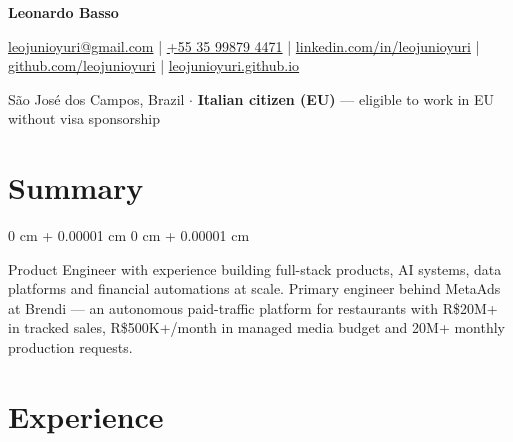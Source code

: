 \documentclass[10pt, a4paper]{article}
\newenvironment{onecolentry}{
    \begin{adjustwidth}{
        0 cm + 0.00001 cm
    }{
        0 cm + 0.00001 cm
    }
}{
    \end{adjustwidth}
}
\begin{document}
    \begin{center}
        {\fontsize{25pt}{25pt}\selectfont \textbf{Leonardo Basso}}

        \vspace{5pt}

        \normalsize
        \href{mailto:leojunioyuri@gmail.com}{leojunioyuri@gmail.com}
        \quad|\quad
        \href{tel:+5535998794471}{+55 35 99879 4471}
        \quad|\quad
        \href{https://linkedin.com/in/leojunioyuri}{linkedin.com/in/leojunioyuri}
        \quad|\quad
        \href{https://github.com/leojunioyuri}{github.com/leojunioyuri}
        \quad|\quad
        \href{https://leojunioyuri.github.io}{leojunioyuri.github.io}

        \vspace{3pt}
        {\small São José dos Campos, Brazil \quad $\cdot$ \quad \textbf{Italian citizen (EU)} — eligible to work in EU without visa sponsorship}
    \end{center}

    \vspace{3pt}

    \section{Summary}
    \vspace{0.1 cm}
    \begin{onecolentry}
        Product Engineer with experience building full-stack products, AI systems, data platforms and financial automations at scale.
        Primary engineer behind MetaAds at Brendi --- an autonomous paid-traffic platform for restaurants with R\$20M+ in tracked sales, R\$500K+/month in managed media budget and 20M+ monthly production requests.
    \end{onecolentry}

    \vspace{0.18 cm}

    \section{Experience}
\end{document}
